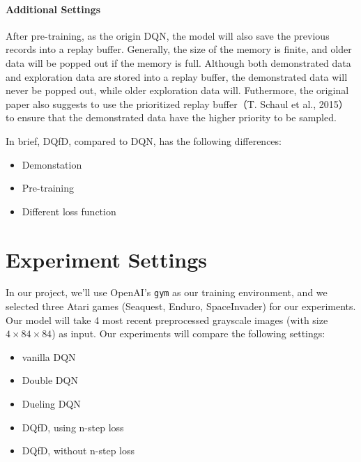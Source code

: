 \documentclass[a0,portrait]{a0poster}
\begin{document}
\begin{multicols}{2}
\paragraph{Additional Settings} After pre-training, as the origin DQN, the model will also save the previous records into a replay buffer. Generally, the size of the memory is finite, and older data will be popped out if the memory is full. Although both demonstrated data and exploration data are stored into a replay buffer, the demonstrated data will never be popped out, while older exploration data will. Futhermore, the original paper also suggests to use the prioritized replay buffer（T. Schaul et al., 2015） \cite{DBLP:journals/corr/SchaulQAS15} to ensure that the demonstrated data have the higher priority to be sampled. \par
In brief, DQfD, compared to DQN, has the following differences:
\begin{itemize}
    \item Demonstation
    \item Pre-training
    \item Different loss function
\end{itemize}


\color{DarkSlateGray} %

\section*{Experiment Settings}

In our project, we'll use OpenAI's \texttt{gym} as our training environment, and we selected three Atari games (Seaquest, Enduro, SpaceInvader) for our experiments. Our model will take 4 most recent preprocessed grayscale images (with size $4\times 84 \times 84$) as input. Our experiments will compare the following settings:
\begin{itemize}
    \item vanilla DQN
    \item Double DQN
    \item Dueling DQN
    \item DQfD, using n-step loss
    \item DQfD, without n-step loss
\end{itemize}


\end{multicols}
\end{document}
